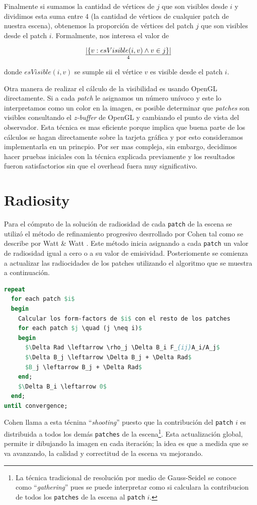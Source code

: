 \documentclass[letterpaper]{article}
\begin{document}
Finalmente si sumamos la cantidad de vértices de $j$ que son visibles
desde $i$ y dividimos esta suma entre 4 (la cantidad de vértices de
cualquier patch de nuestra escena), obtenemos la proporción de
vértices del patch $j$ que son visibles desde el patch
$i$. Formalmente, nos interesa el valor de

$$ |\{v:esVisible(i,v) \wedge v \in j\}|\over4$$

donde $esVisible(i,v)$ se sumple sii el vértice $v$ es visible desde
el patch $i$.

Otra manera de realizar el cálculo de la visibilidad es usando OpenGL
directamente. Si a cada \textsl{patch} le asignamos un número unívoco
y este lo interpretamos como un color en la imagen, es posible
determinar que \textsl{patches} son visibles consultando el
\textsl{z-buffer} de OpenGL y cambiando el punto de vista del
observador. Esta técnica es mas eficiente porque implica que buena
parte de los cálculos se hagan directamente sobre la tarjeta gráfica y
por esto consideramos implementarla en un princpio. Por ser mas
compleja, sin embargo, decidimos hacer pruebas iniciales con la
técnica explicada previamente y los resultados fueron satisfactorios
sin que el overhead fuera muy significativo.

\section{Radiosity}
\label{sec:rad}
Para el cómputo de la solución de radiosidad de cada \texttt{patch} de
la escena se utilizó el método de refinamiento progresivo
desrrollado por Cohen \cite{cohen} tal como se describe por Watt \&
Watt \cite{Watt92}. Este método inicia asignando a cada \texttt{patch}
un valor de radiosidad igual a cero o a su valor de
emisividad. Posteriomente se comienza a actualizar las radiocidades de
los patches utilizando el algoritmo que se muestra a continuación.
\pagebreak{}
\begin{lstlisting}[language=pascal,frame=single,mathescape=True]
repeat 
  for each patch $i$
  begin
    Calcular los form-factors de $i$ con el resto de los patches
    for each patch $j \quad (j \neq i)$
    begin
      $\Delta Rad \leftarrow \rho_j \Delta B_i F_{ij}A_i/A_j$
      $\Delta B_j \leftarrow \Delta B_j + \Delta Rad$
      $B_j \leftarrow B_j + \Delta Rad$
    end;   
    $\Delta B_i \leftarrow 0$
  end;
until convergence;
\end{lstlisting}

Cohen llama a esta técnina ``\textsl{shooting}'' puesto que la
contribución del \texttt{patch} $i$ es distribuida a todos los demás
\texttt{patches} de la escena\footnote{La técnica tradicional de
  resolución por medio de Gauss-Seidel se conoce como
  ``\textsl{gathering}'' pues se puede interpretar como si calculara
  la contribucion de todos los \texttt{patches} de la escena al
  \texttt{patch} $i$.}. Esta actualización global, permite ir
dibujando la imagen en cada iteración; la idea es que a medida que se
va avanzando, la calidad y correctitud de la escena va mejorando.
\end{document}
